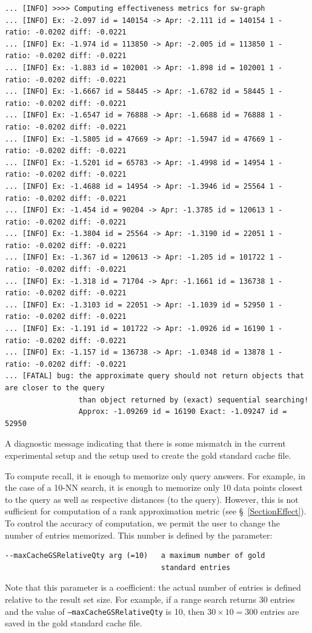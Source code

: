 \documentclass[runningheads,a4paper]{llncs}
\newcommand{\ttt}[1]{\texttt{#1}}
\begin{document}
{\begin{table}
\scriptsize
\begin{verbatim}
... [INFO] >>>> Computing effectiveness metrics for sw-graph
... [INFO] Ex: -2.097 id = 140154 -> Apr: -2.111 id = 140154 1 - ratio: -0.0202 diff: -0.0221
... [INFO] Ex: -1.974 id = 113850 -> Apr: -2.005 id = 113850 1 - ratio: -0.0202 diff: -0.0221
... [INFO] Ex: -1.883 id = 102001 -> Apr: -1.898 id = 102001 1 - ratio: -0.0202 diff: -0.0221
... [INFO] Ex: -1.6667 id = 58445 -> Apr: -1.6782 id = 58445 1 - ratio: -0.0202 diff: -0.0221
... [INFO] Ex: -1.6547 id = 76888 -> Apr: -1.6688 id = 76888 1 - ratio: -0.0202 diff: -0.0221
... [INFO] Ex: -1.5805 id = 47669 -> Apr: -1.5947 id = 47669 1 - ratio: -0.0202 diff: -0.0221
... [INFO] Ex: -1.5201 id = 65783 -> Apr: -1.4998 id = 14954 1 - ratio: -0.0202 diff: -0.0221
... [INFO] Ex: -1.4688 id = 14954 -> Apr: -1.3946 id = 25564 1 - ratio: -0.0202 diff: -0.0221
... [INFO] Ex: -1.454 id = 90204 -> Apr: -1.3785 id = 120613 1 - ratio: -0.0202 diff: -0.0221
... [INFO] Ex: -1.3804 id = 25564 -> Apr: -1.3190 id = 22051 1 - ratio: -0.0202 diff: -0.0221
... [INFO] Ex: -1.367 id = 120613 -> Apr: -1.205 id = 101722 1 - ratio: -0.0202 diff: -0.0221
... [INFO] Ex: -1.318 id = 71704 -> Apr: -1.1661 id = 136738 1 - ratio: -0.0202 diff: -0.0221
... [INFO] Ex: -1.3103 id = 22051 -> Apr: -1.1039 id = 52950 1 - ratio: -0.0202 diff: -0.0221
... [INFO] Ex: -1.191 id = 101722 -> Apr: -1.0926 id = 16190 1 - ratio: -0.0202 diff: -0.0221
... [INFO] Ex: -1.157 id = 136738 -> Apr: -1.0348 id = 13878 1 - ratio: -0.0202 diff: -0.0221
... [FATAL] bug: the approximate query should not return objects that are closer to the query 
                 than object returned by (exact) sequential searching! 
                 Approx: -1.09269 id = 16190 Exact: -1.09247 id = 52950
\end{verbatim}
\caption{\label{TableFailGSCheck} A diagnostic message indicating that
there is some mismatch in the current experimental setup and the setup used to create
the gold standard cache file.}
\end{table}

To compute recall, it is enough to memorize only query answers.
For example, in the case of a 10-NN search, it is enough to memorize only 10 data points closest 
to the query as well as respective distances (to the query).
However, this is not sufficient for computation of  a rank approximation metric (see \S~\ref{SectionEffect}).
To control the accuracy of computation, we permit the user to change the number of entries memorized.
This number is defined by the parameter:
\begin{verbatim}
--maxCacheGSRelativeQty arg (=10)   a maximum number of gold 
                                    standard entries
\end{verbatim}
Note that this parameter is a coefficient: the actual number of entries is defined relative to
the result set size. For example, if a range search returns 30 entries and the value of 
\ttt{--maxCacheGSRelativeQty} is 10, then $30 \times 10=300$ entries are saved in the gold standard
cache file.

}
\end{document}
